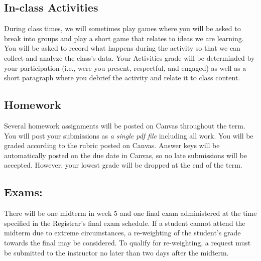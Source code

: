 \hypertarget{grading_activity}{\subsection{In-class Activities}}

  During class times, we will sometimes play games where you will be asked to break into groups and play a short game that relates to ideas we are learning.
  You will be asked to record what happens during the activity so that we can collect and analyze the class's data.
  Your Activities grade will be determinded by your participation (i.e., were you present, respectful, and engaged) as well as a short paragraph where you debrief the activity and relate it to class content.

  \hypertarget{grading_HW}{\subsection{Homework}}

  Several homework assignments will be posted on Canvas throughout the term. You will post your submissions as \textit{a single pdf file} including all work. You will be graded according to the rubric posted on Canvas. 
  Answer keys will be automatically posted on the due date in Canvas, so no late submissions will be accepted. However, your lowest grade will be dropped at the end of the term.

 
\hypertarget{grading_exam}{\subsection{Exams:}}
  There will be one midterm in week 5 and one final exam administered at the time specified in the Registrar’s final exam schedule.
  If a student cannot attend the midterm due to extreme circumstances, a re-weighting of the student’s grade towards the final may be considered.
  To qualify for re-weighting, a request must be submitted to the instructor no later than two days after the midterm.


